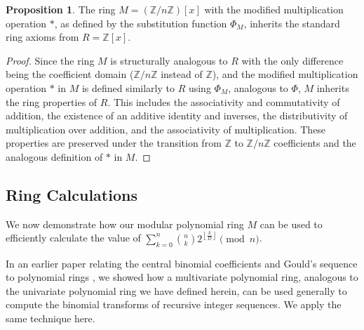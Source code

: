 \documentclass{article}
\theoremstyle{plain}
\theoremstyle{definition}
\newtheorem{proposition}{Proposition}
\begin{document}
\begin{proposition} \label{proposition:modularring:1}
The ring \( M = (\mathbb{Z}/n\mathbb{Z})[x] \) with the modified multiplication operation \(\ast\), as defined by the substitution function \(\Phi_M\), inherits the standard ring axioms from \( R = \mathbb{Z}[x] \).
\end{proposition}
\begin{proof}
Since the ring \( M \) is structurally analogous to \( R \) with the only difference being the coefficient domain (\(\mathbb{Z}/n\mathbb{Z}\) instead of \(\mathbb{Z}\)), and the modified multiplication operation \(\ast\) in \( M \) is defined similarly to \( R \) using \(\Phi_M\), analogous to \(\Phi\), \( M \) inherits the ring properties of \( R \). This includes the associativity and commutativity of addition, the existence of an additive identity and inverses, the distributivity of multiplication over addition, and the associativity of multiplication. These properties are preserved under the transition from \(\mathbb{Z}\) to \(\mathbb{Z}/n\mathbb{Z}\) coefficients and the analogous definition of \(\ast\) in \( M \).
\end{proof}

\subsection{Ring Calculations}
We now demonstrate how our modular polynomial ring $M$ can be used to efficiently calculate the value of $\sum_{k=0}^{n} \binom{n}{k} 2^{\left\lfloor \frac{k}{D} \right\rfloor} \pmod{n}$.

In an earlier paper relating the central binomial coefficients and Gould's sequence to polynomial rings \cite{shunia2023polynomial}, we showed how a multivariate polynomial ring, analogous to the univariate polynomial ring we have defined herein, can be used generally to compute the binomial transforms of recursive integer sequences. We apply the same technique here.
\end{document}
